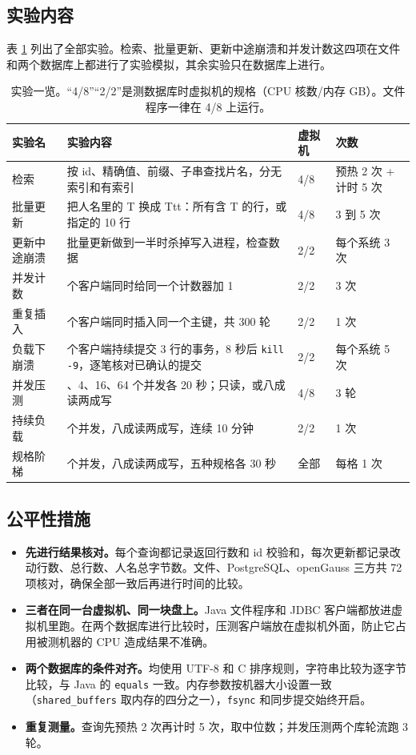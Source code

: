 \documentclass[UTF8,a4paper,zihao=5,fontset=none]{ctexart}
\newcommand{\code}[1]{\texttt{#1}}
\begin{document}
\subsection{实验内容}

表 \ref{tab:workloads} 列出了全部实验。检索、批量更新、更新中途崩溃和并发计数这四项在文件和两个数据库上都进行了实验模拟，其余实验只在数据库上进行。

\begin{table}[H]
\centering\small
\caption{实验一览。“4/8”“2/2”是测数据库时虚拟机的规格（CPU 核数/内存 GB）。文件程序一律在 4/8 上运行。}
\label{tab:workloads}
\begin{tabularx}{\linewidth}{@{}l>{\raggedright\arraybackslash}Xll@{}}
\toprule
实验名 & 实验内容 & 虚拟机 & 次数 \\
\midrule
检索 & 按 id、精确值、前缀、子串查找片名，分无索引和有索引 & 4/8 & 预热 2 次 + 计时 5 次 \\
批量更新 & 把人名里的 T 换成 Ttt：所有含 T 的行，或指定的 10 行 & 4/8 & 3 到 5 次 \\
更新中途崩溃 & 批量更新做到一半时杀掉写入进程，检查数据 & 2/2 & 每个系统 3 次 \\
并发计数 & 8 个客户端同时给同一个计数器加 1 & 2/2 & 3 次 \\
重复插入 & 16 个客户端同时插入同一个主键，共 300 轮 & 2/2 & 1 次 \\
负载下崩溃 & 8 个客户端持续提交 3 行的事务，8 秒后 \code{kill -9}，逐笔核对已确认的提交 & 2/2 & 每个系统 5 次 \\
并发压测 & 1、4、16、64 个并发各 20 秒；只读，或八成读两成写 & 4/8 & 3 轮 \\
持续负载 & 16 个并发，八成读两成写，连续 10 分钟 & 2/2 & 1 次 \\
规格阶梯 & 16 个并发，八成读两成写，五种规格各 30 秒 & 全部 & 每格 1 次 \\
\bottomrule
\end{tabularx}
\end{table}

\subsection{公平性措施}

\begin{itemize}
  \item \textbf{先进行结果核对。}每个查询都记录返回行数和 id 校验和，每次更新都记录改动行数、总行数、人名总字节数。文件、PostgreSQL、openGauss 三方共 72 项核对，确保全部一致后再进行时间的比较。
  \item \textbf{三者在同一台虚拟机、同一块盘上。}Java 文件程序和 JDBC 客户端都放进虚拟机里跑。在两个数据库进行比较时，压测客户端放在虚拟机外面，防止它占用被测机器的 CPU 造成结果不准确。
  \item \textbf{两个数据库的条件对齐。}均使用 UTF-8 和 C 排序规则，字符串比较为逐字节比较，与 Java 的 \code{equals} 一致。内存参数按机器大小设置一致（\code{shared\_buffers} 取内存的四分之一），\code{fsync} 和同步提交始终开启。
  \item \textbf{重复测量。}查询先预热 2 次再计时 5 次，取中位数；并发压测两个库轮流跑 3 轮。
\end{itemize}
\end{document}
